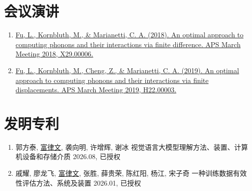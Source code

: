 \documentclass[
  a4paper,
  12pt
]{cv}
\begin{document}
\begin{enumerate}
%
\end{enumerate}


%


\section{会议演讲}

\begin{enumerate}
\item
\href{https://meetings.aps.org/Meeting/MAR18/Event/322388}{
\underline{Fu, L.}, Kornbluth, M., \& Marianetti, C. A. (2018).
An optimal approach to computing phonons and their interactions via finite difference.
APS March Meeting 2018, X29.00006.
}
%
\item
\href{https://meetings.aps.org/Meeting/MAR19/Session/H22.3}{
\underline{Fu, L.}, Kornbluth, M., Cheng, Z., \& Marianetti, C. A. (2019).
An optimal approach to computing phonons and their interactions via finite displacements.
APS March Meeting 2019, H22.00003.
}
%
\end{enumerate}


\section{发明专利}


\begin{enumerate}
\item
郭方泰, \underline{富律文}, 袭向明, 许增辉, 谢冰
视觉语言大模型理解方法、装置、计算机设备和存储介质
2026.08, 已授权
%
\item
戚耀, 廖龙飞, \underline{富律文}, 张胜, 薛贵荣, 陈红阳, 杨江, 宋子奇
一种训练数据有效性评估方法、系统及装置
2026.01, 已授权
\end{enumerate}
\end{document}
